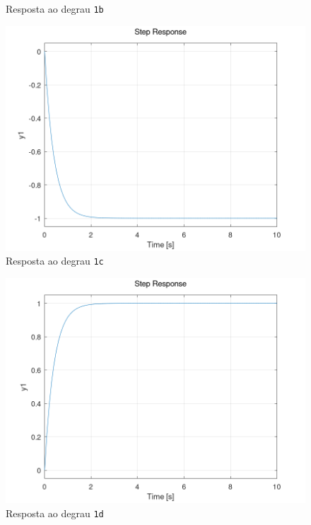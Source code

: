 \documentclass[a4paper,12pt]{article}
\begin{document}
\begin{enumerate}
\begin{figure}[h]
            \caption{Resposta ao degrau \texttt{1b}}
            \label{fig1b}
        \end{figure}
        \begin{figure}[h]
            \centering
            \includegraphics[scale=0.4]{../fig/fig1c.png}
            \caption{Resposta ao degrau \texttt{1c}}
            \label{fig1c}
        \end{figure}
        \begin{figure}[h]
            \centering
            \includegraphics[scale=0.4]{../fig/fig1d.png}
            \caption{Resposta ao degrau \texttt{1d}}
            \label{fig1d}
        \end{figure}
        \begin{figure}[h]

\end{figure}
\end{enumerate}
\end{document}
